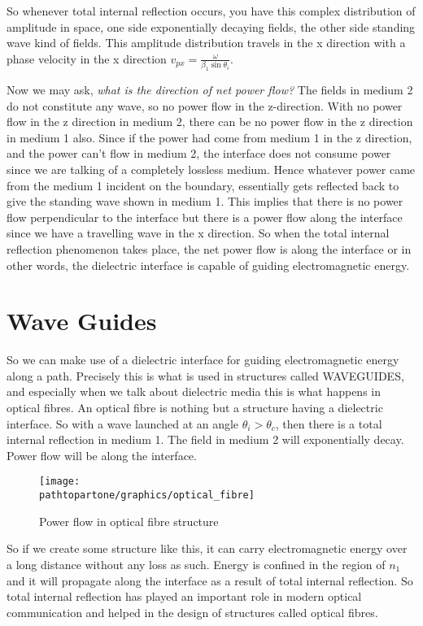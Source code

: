 So whenever total internal reflection occurs, you have this complex distribution of amplitude in space, one side exponentially decaying fields, the other side standing wave kind of fields. This amplitude distribution travels in the x direction with a phase velocity in the x direction $v_{px} = \frac{\omega}{\beta_1\sin\theta_i}$.

Now we may ask, \emph{what is the direction of net power flow?} The fields in medium 2 do not constitute any wave, so no power flow in the z-direction. With no power flow in the z direction in medium 2, there can be no power flow in the z direction in medium 1 also. Since if the power had come from medium 1 in the z direction, and the power can't flow in medium 2, the interface does not consume power since we are talking of a completely lossless medium. Hence whatever power came from the medium 1 incident on the boundary, essentially gets reflected back to give the standing wave shown in medium 1. This implies that there is no power flow perpendicular to the interface but there is a power flow along the interface since we have a travelling wave in the x direction. So when the total internal reflection phenomenon takes place, the net power flow is along the interface or in other words, the dielectric interface is capable of guiding electromagnetic energy.

\section{Wave Guides}

So we can make use of a dielectric interface for guiding electromagnetic energy along a path. Precisely this is what is used in structures called WAVEGUIDES, and especially when we talk about dielectric media this is what happens in optical fibres. An optical fibre is nothing but a structure having a dielectric interface. So with a wave launched at an angle $\theta_i > \theta_c$,
then there is a total internal reflection in medium 1. The field in medium 2 will exponentially decay. Power flow will be along the interface.

\begin{figure}[h]
\centering
\texttt{[image: \\pathtopartone/graphics/optical\_fibre]}
\caption{Power flow in optical fibre structure}
\end{figure}

So if we create some structure like this, it can carry electromagnetic energy over a long distance without any loss as such. Energy is confined in the region of $n_1$ and it will propagate along the interface as a result of total internal reflection. So total internal reflection has played an important role in modern optical communication and helped in the design of structures called optical fibres. 
